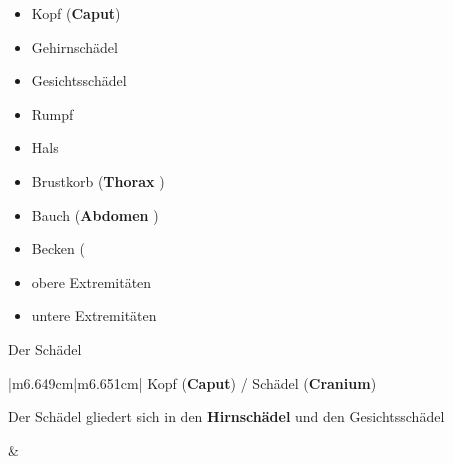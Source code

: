 \documentclass{article}
\makeatletter
\newcommand\gEs[1]{\textbf{\textcolor[rgb]{0.0,0.0,0.5019608}{#1}}}
\newcommand\gEs[1]{\textbf{\textcolor[rgb]{0.0,0.0,0.5019608}{#1}}}
\newcommand\gT[1]{\textbf{\textup{\textcolor[rgb]{0.0,0.5019608,0.0}{#1}}}}
\newcommand\captionof[1]{\def\@captype{#1}\caption}
\makeatother
\begin{document}
\begin{itemize}
\item {\mdseries
Kopf  (\gT{Caput})}

\end{itemize}
\begin{itemize}
\item {\mdseries
Gehirnsch\"adel}

\item {\mdseries
Gesichtssch\"adel}

\end{itemize}
\begin{itemize}
\item {\mdseries
Rumpf  }

\end{itemize}
\begin{itemize}
\item {\mdseries
Hals }

\item {\mdseries
Brustkorb (\gEs{Thorax} )}

\item {\mdseries
Bauch (\gEs{Abdomen} )}

\item {\mdseries
Becken (}

\end{itemize}
\begin{itemize}
\item {\mdseries
obere Extremit\"aten }

\item {\mdseries
untere Extremit\"aten}

\end{itemize}
{\mdseries\color[rgb]{0.0,0.0,0.5019608}
Der Sch\"adel }

\begin{center}
\tablehead{}\begin{supertabular}{|m{6.649cm}|m{6.651cm}|}
\hline
{\mdseries Kopf (\gT{Caput}) / Sch\"adel
(\gT{Cranium})}

{\mdseries Der Sch\"adel gliedert sich in den
\gT{Hirnsch\"adel} und den Gesichtssch\"adel}

\captionof{figure}[Hirnsch\"adel vs. Gesichts\-sch\"adel]{Hirnsch\"adel
vs. Gesichts\-sch\"adel}
 &
{\par}

\\\hline
\end{supertabular}
\end{center}
\end{document}
